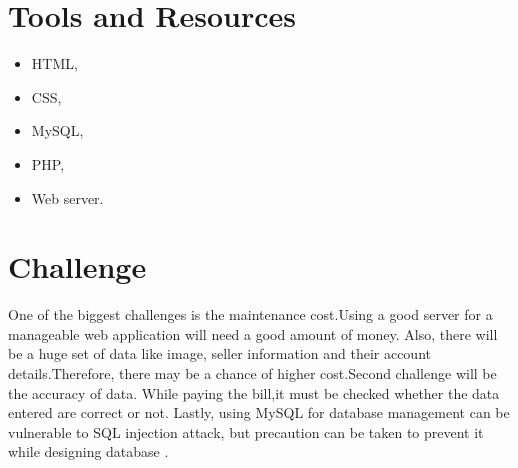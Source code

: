 \documentclass[12pt,a4paper]{article}
\begin{document}
\section*{Tools and Resources} %
\label{sec:tools_and_resources}
\begin{itemize}
  \item HTML,
  \item CSS, 
  \item MySQL,
  \item PHP,
  \item Web server.

\end{itemize}

\section*{Challenge} %
\label{sec:challenge}
One of the biggest challenges is the maintenance cost.Using a good server for a manageable web application will need a good amount of money. Also, there will be a huge set of data like image, seller information and their account details.Therefore, there may be a chance of higher cost.Second challenge will be the accuracy of data. While paying the bill,it must be checked whether the data entered are correct or not. Lastly, using MySQL for database management can be vulnerable to SQL injection attack, but precaution can be taken to prevent it while designing database .
\end{document}
